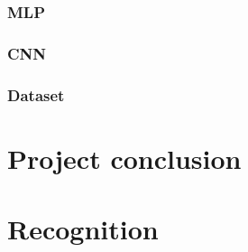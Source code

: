 \documentclass[11pt,a4paper,UKenglish]{article}
\begin{document}
\subsubsection{MLP}
\subsubsection{CNN}
\subsubsection{Dataset}


\section{Project conclusion}
\label{sec:Project conclusion}

\section{Recognition}
\label{sec:Recognition}




\end{document}

